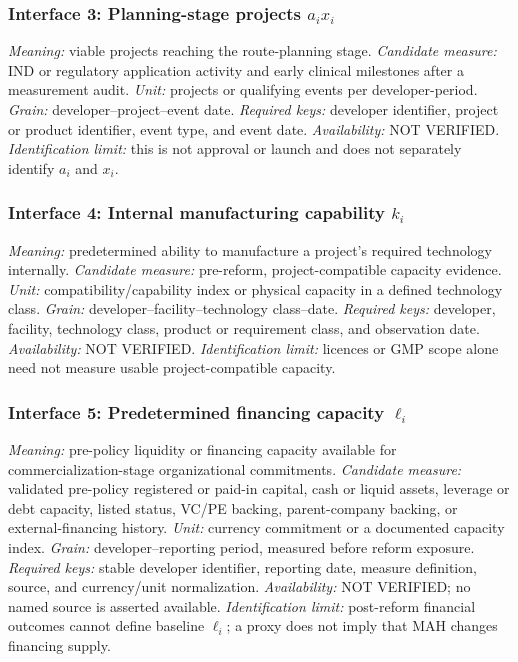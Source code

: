 \subsubsection{Interface 3: Planning-stage projects \texorpdfstring{\(a_ix_i\)}{a(i)x(i)}}
\textit{Meaning:} viable projects reaching the route-planning stage.
\textit{Candidate measure:} IND or regulatory application activity and early
clinical milestones after a measurement audit.
\textit{Unit:} projects or qualifying events per developer-period.
\textit{Grain:} developer--project--event date.
\textit{Required keys:} developer identifier, project or product identifier,
event type, and event date.
\textit{Availability:} NOT VERIFIED.
\textit{Identification limit:} this is not approval or launch and does not
separately identify \(a_i\) and \(x_i\).

\subsubsection{Interface 4: Internal manufacturing capability \texorpdfstring{\(k_i\)}{k(i)}}
\textit{Meaning:} predetermined ability to manufacture a project's required
technology internally.
\textit{Candidate measure:} pre-reform, project-compatible capacity evidence.
\textit{Unit:} compatibility/capability index or physical capacity in a
defined technology class.
\textit{Grain:} developer--facility--technology class--date.
\textit{Required keys:} developer, facility, technology class, product or
requirement class, and observation date.
\textit{Availability:} NOT VERIFIED.
\textit{Identification limit:} licences or GMP scope alone need not measure
usable project-compatible capacity.

\subsubsection{Interface 5: Predetermined financing capacity \texorpdfstring{\(\ell_i\)}{ell(i)}}
\textit{Meaning:} pre-policy liquidity or financing capacity available for
commercialization-stage organizational commitments.
\textit{Candidate measure:} validated pre-policy registered or paid-in
capital, cash or liquid assets, leverage or debt capacity, listed status,
VC/PE backing, parent-company backing, or external-financing history.
\textit{Unit:} currency commitment or a documented capacity index.
\textit{Grain:} developer--reporting period, measured before reform exposure.
\textit{Required keys:} stable developer identifier, reporting date, measure
definition, source, and currency/unit normalization.
\textit{Availability:} NOT VERIFIED; no named source is asserted available.
\textit{Identification limit:} post-reform financial outcomes cannot define
baseline \(\ell_i\); a proxy does not imply that MAH changes financing supply.

